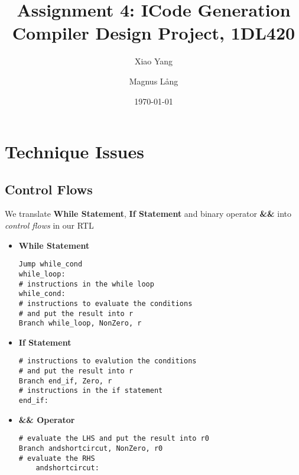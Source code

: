 \documentclass[a4paper,11pt]{article}
\title{Assignment 4: ICode Generation \\
       Compiler Design Project, 1DL420}
\author{Xiao Yang \and Magnus L{\aa}ng}
\date{\today}
\begin{document}
\maketitle

\section{Technique Issues}
\subsection{Control Flows}
	We translate \textbf{While Statement}, \textbf{If Statement} and binary operator \textbf{\&\& } into \textit{control flows} in our RTL
	\begin{itemize}
	\item \textbf{While Statement} 
		\lstset{language=[mips]Assembler}
		\begin{lstlisting}
Jump while_cond
while_loop:
# instructions in the while loop
while_cond:
# instructions to evaluate the conditions
# and put the result into r
Branch while_loop, NonZero, r
		\end{lstlisting}
	
	\item \textbf{If Statement}
	\begin{lstlisting}
# instructions to evalution the conditions
# and put the result into r
Branch end_if, Zero, r
# instructions in the if statement
end_if:
	\end{lstlisting}
	
	\item \textbf{\&\& Operator}
	\begin{lstlisting}
# evaluate the LHS and put the result into r0
Branch andshortcircut, NonZero, r0
# evaluate the RHS 
    andshortcircut:
	\end{lstlisting}
	\end{itemize}
	
\end{document}
